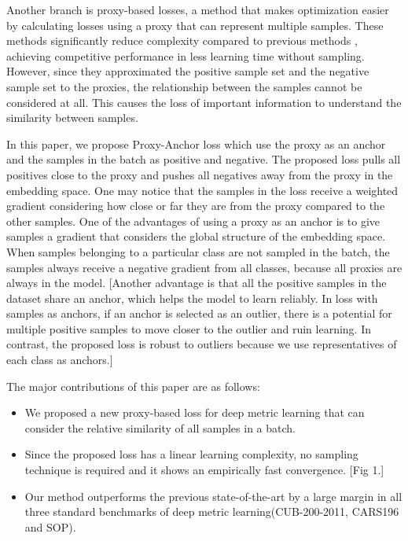 \documentclass[10pt,twocolumn,letterpaper]{article}
\newcommand{\suha}[1]{{\color{brown}{#1}}}
\begin{document}
Another branch is proxy-based losses, a method that makes optimization easier by calculating losses using a proxy that can represent multiple samples. \cite{movshovitz2017no, aziere2019ensemble, Qian_2019_ICCV} \suha{(define proxy first. also, cite relevant papers)} These methods significantly reduce complexity compared to previous methods \suha{(how and why)}, achieving competitive performance in less learning time without sampling. However, since they approximated the positive sample set and the negative sample set to the proxies, the relationship between the samples cannot be considered at all. This causes the loss of important information to understand the similarity between samples. \suha{(overall the description is vague.)}





In this paper, we propose Proxy-Anchor loss which use the proxy as an anchor and the samples in the batch as positive and negative. The proposed loss pulls all positives close to the proxy and pushes all negatives away from the proxy in the embedding space. One may notice that the samples in the loss receive a weighted gradient considering how close or far they are from the proxy compared to the other samples. One of the advantages of using a proxy as an anchor is to give samples a gradient that considers the global structure of the embedding space. When samples belonging to a particular class are not sampled in the batch, the samples always receive a negative gradient from all classes, because all proxies are always in the model. [Another advantage is that all the positive samples in the dataset share an anchor, which helps the model to learn reliably. In loss with samples as anchors, if an anchor is selected as an outlier, there is a potential for multiple positive samples to move closer to the outlier and ruin learning. In contrast, the proposed loss is robust to outliers because we use representatives of each class as anchors.]

The major contributions of this paper are as follows:
\begin{itemize}
   \item We proposed a new proxy-based loss for deep metric learning that can consider the relative similarity of all samples in a batch.
   \item Since the proposed loss has a linear learning complexity, no sampling technique is required and it shows an empirically fast convergence. [Fig 1.]
   \item Our method outperforms the previous state-of-the-art by a large margin in all three standard benchmarks of deep metric learning(CUB-200-2011, CARS196 and SOP).
\end{itemize}
\fi
\end{document}
